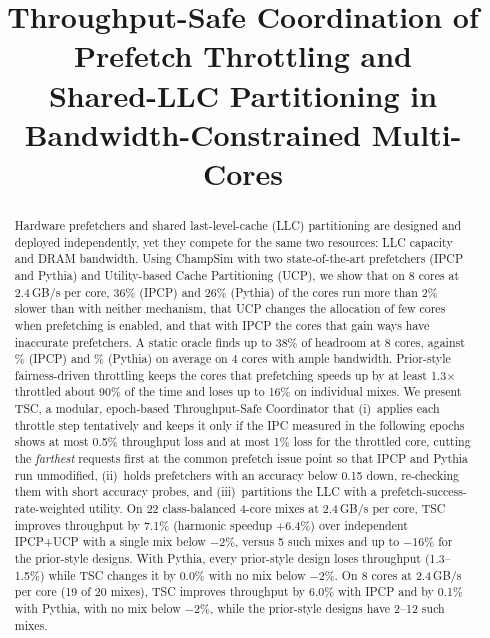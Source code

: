 \IfFileExists{IEEEtran.cls}{\documentclass[conference]{IEEEtran}}{\documentclass[10pt,twocolumn]{article}}
\title{Throughput-Safe Coordination of Prefetch Throttling and\\Shared-LLC Partitioning in Bandwidth-Constrained Multi-Cores}
\author{%
  \IEEEauthorblockN{Madhur Vaidya}\IEEEauthorblockA{\texttt{cs26mtech11003@iith.ac.in}}
  \and
  \IEEEauthorblockN{Anandu Gagarin}\IEEEauthorblockA{\texttt{cs26mtech14003@iith.ac.in}}
  \and
  \IEEEauthorblockN{Shanmugavignesh}\IEEEauthorblockA{\texttt{cs25mtech12017@iith.ac.in}}
}
\begin{document}
\maketitle

\begin{abstract}
Hardware prefetchers and shared last-level-cache (LLC) partitioning are designed and deployed independently, yet they
compete for the same two resources: LLC capacity and DRAM bandwidth.  Using ChampSim with two state-of-the-art
prefetchers (IPCP and Pythia) and Utility-based Cache Partitioning (UCP), we show that on 8 cores at 2.4\,GB/s per core, 36\% (IPCP) and 26\% (Pythia) of the cores run more than 2\% slower
than with neither mechanism, that UCP changes the allocation of few cores when prefetching is enabled, and that with
IPCP the cores that gain ways have inaccurate prefetchers.  A static oracle finds up to 38\% of headroom at 8 cores,
against \OrcIpMean\% (IPCP) and \OrcPyMean\% (Pythia) on average on 4 cores with ample bandwidth.  Prior-style
fairness-driven throttling keeps the cores that prefetching speeds up by at least 1.3$\times$ throttled about 90\% of
the time and loses up to 16\% on individual mixes.  We present TSC, a modular, epoch-based Throughput-Safe
Coordinator that (i)~applies each throttle step tentatively and keeps it only if the IPC measured in the following epochs shows at most
0.5\% throughput loss and at most 1\% loss for the throttled core, cutting the \emph{farthest} requests first at the common prefetch issue point so that
IPCP and Pythia run unmodified, (ii)~holds prefetchers with an accuracy below 0.15 down, re-checking them with short
accuracy probes, and (iii)~partitions the LLC with a prefetch-success-rate-weighted utility.  On 22 class-balanced 4-core mixes at 2.4\,GB/s per
core, TSC improves throughput by 7.1\% (harmonic speedup +6.4\%) over independent IPCP+UCP with a single
mix below $-2\%$, versus 5 such mixes and up to $-16\%$ for the prior-style designs.  With Pythia, every prior-style design loses throughput (1.3--1.5\%) while TSC changes it by 0.0\% with no mix
below $-2\%$.  On 8 cores at 2.4\,GB/s per core (19 of 20 mixes), TSC improves throughput by 6.0\% with IPCP and
by 0.1\% with Pythia, with no mix below $-2\%$, while the prior-style designs have 2--12 such mixes.
\end{abstract}










\end{document}
